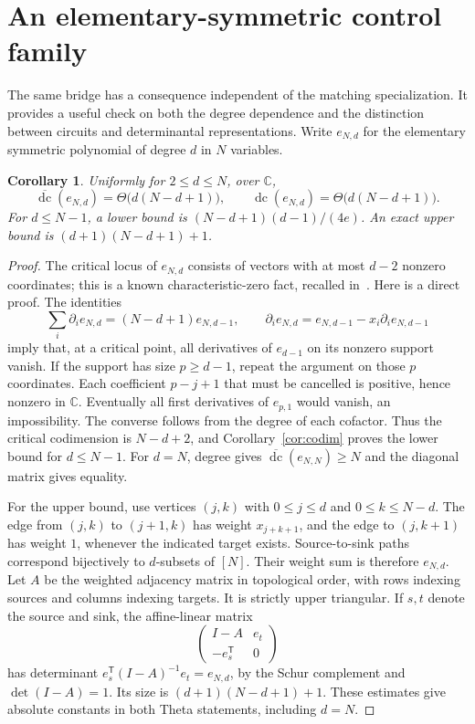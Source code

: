 \documentclass[11pt]{article}
\newtheorem{corollary}[theorem]{Corollary}
\theoremstyle{remark}\newtheorem{remark}[theorem]{Remark}
\DeclareMathOperator{\dc}{dc}
\newcommand{\bdc}{\overline{\dc}}
\newcommand{\C}{\mathbb C}
\begin{document}
\section{An elementary-symmetric control family}\label{sec:elementary}

The same bridge has a consequence independent of the matching
specialization. It provides a useful check on both the degree dependence
and the distinction between circuits and determinantal representations.
Write $e_{N,d}$ for the elementary symmetric polynomial of degree $d$
in $N$ variables.

\begin{corollary}\label{cor:elementary}
Uniformly for $2\le d\le N$, over $\C$,
\[
 \bdc(e_{N,d})=\Theta\bigl(d(N-d+1)\bigr),\qquad
 \dc(e_{N,d})=\Theta\bigl(d(N-d+1)\bigr).
\]
For $d\le N-1$, a lower bound is
$(N-d+1)(d-1)/(4e)$. An exact upper bound is
$(d+1)(N-d+1)+1$.
\end{corollary}

\begin{proof}
The critical locus of $e_{N,d}$ consists of vectors with at most
$d-2$ nonzero coordinates; this is a known characteristic-zero
fact, recalled in~\cite{Orzel}. Here is a direct proof.
The identities
\[
 \sum_i\partial_i e_{N,d}=(N-d+1)e_{N,d-1},\qquad
 \partial_i e_{N,d}=e_{N,d-1}-x_i\partial_i e_{N,d-1}
\]
imply that, at a critical point, all derivatives of $e_{d-1}$ on
its nonzero support vanish. If the support has size $p\ge d-1$,
repeat the argument on those $p$ coordinates. Each coefficient
$p-j+1$ that must be cancelled is positive, hence nonzero in $\C$.
Eventually all first derivatives of $e_{p,1}$ would vanish, an
impossibility. The converse follows from the degree of each cofactor.
Thus the critical codimension is $N-d+2$, and
Corollary~\ref{cor:codim} proves the lower bound for $d\le N-1$.
For $d=N$, degree gives $\bdc(e_{N,N})\ge N$ and the diagonal
matrix gives equality.

For the upper bound, use vertices $(j,k)$ with
$0\le j\le d$ and $0\le k\le N-d$. The edge from $(j,k)$ to
$(j+1,k)$ has weight $x_{j+k+1}$, and the edge to $(j,k+1)$ has
weight $1$, whenever the indicated target exists. Source-to-sink
paths correspond bijectively to $d$-subsets of $[N]$. Their weight
sum is therefore $e_{N,d}$. Let $A$ be the weighted adjacency matrix
in topological order, with rows indexing sources and columns indexing
targets. It is strictly upper triangular. If $s,t$ denote the source
and sink, the affine-linear matrix
\[
 \begin{pmatrix}I-A&e_t\\-e_s^{\mathsf T}&0\end{pmatrix}
\]
has determinant $e_s^{\mathsf T}(I-A)^{-1}e_t=e_{N,d}$, by the Schur
complement and $\det(I-A)=1$. Its size is
$(d+1)(N-d+1)+1$. These estimates give absolute constants in both
Theta statements, including $d=N$.
\end{proof}
\end{document}
